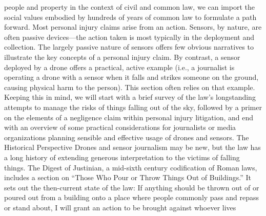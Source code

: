 people and property in the context of civil and common law, we can import
the social values embodied by hundreds of years of common law to formulate
a path forward.
Most personal injury claims arise from an action. Sensors, by nature, are
often passive devices—the action taken is most typically in the deployment
and collection. The largely passive nature of sensors offers few obvious narratives
to illustrate the key concepts of a personal injury claim. By contrast,
a sensor deployed by a drone offers a practical, active example (i.e., a journalist
is operating a drone with a sensor when it falls and strikes someone
on the ground, causing physical harm to the person). This section often
relies on that example.
Keeping this in mind, we will start with a brief survey of the law's longstanding
attempts to manage the risks of things falling out of the sky, followed
by a primer on the elements of a negligence claim within personal injury
litigation, and end with an overview of some practical considerations for
journalists or media organizations planning sensible and effective usage of
drones and sensors.
The Historical Perspective
Drones and sensor journalism may be new, but the law has a long history of
extending generous interpretation to the victims of falling things.
The Digest of Justinian, a mid-sixth century codification of Roman laws,
includes a section on ``Those Who Pour or Throw Things Out of Buildings.''
It sets out the then-current state of the law:
If anything should be thrown out of or poured out from a building
onto a place where people commonly pass and repass or stand
about, I will grant an action to be brought against whoever lives

